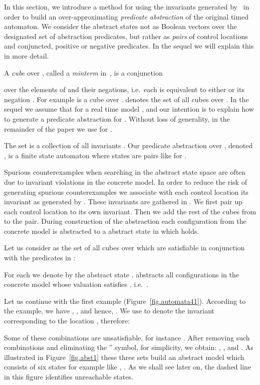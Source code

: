 \documentclass{eptcs}
\begin{document}
In this section, we introduce a method for using the invariants generated by
 \cipm\ in order to build an over-approximating {\em predicate abstraction} of the 
original timed automaton. 
We consider the abstract states not as Boolean vectors over the designated
set of abstraction predicates, but rather as {\em pairs} of control locations and
conjuncted, positive or negative predicates.  
In the sequel we will explain this in more detail.

A {\em cube}  over ,
called a {\em minterm} in~\cite{Lahiri06},
is a conjunction 
 
over the elements of  and their negations, 
i.e.\, each  is equivalent to either  or
its negation .
For example  is a cube over
.   denotes the set of all cubes over
. In the sequel we assume that  for a real time model
 , and our intention is to explain how to generate a predicate
 abstraction for . Without loss of generality, in the remainder of the paper 
we use  for .  
 
  
\begin{definition}[States of . ]
\label{def.abst}
The set  is a
collection of all invariants . Our predicate abstraction over
, denoted , is  a finite state automaton where states are
pairs like  for . 
\end{definition}

Spurious counterexamples when searching in the abstract state space are often due 
to invariant violations in the concrete model.
In order to reduce the risk of generating spurious counterexamples 
we associate with each control location  its invariant
as generated by \cipm . 
These invariants are gathered in .
We first pair up each control location to its own invariant. Then we
add the rest of the cubes from  to the pair. 
During construction of the abstraction each configuration  from the concrete
model is abstracted to a abstract state in which  holds.

Let us consider  as the set of all cubes over  which are
satisfiable in conjunction with the predicates in : 
 



\noindent
For each  we denote by  the abstract state 
.
 abstracts all configurations  in the concrete
model  whose valuation  satisfies , i.e.\ .

\begin{example}
Let us continue with the first example (Figure~\ref{fig.automata41}).
According to the example, we have ,
, 
 and hence, . 
We use  to denote the invariant corresponding to the location , therefore:



Some of these combinations are unsatisfiable, for instance .  
After removing such combinations and eliminating the
'' symbol, for simplicity, we obtain: , , and .
As illustrated in Figure~\ref{fig.abst1} these three sets build an abstract
model  which consists of six states for example like , 
. As we shall see later
on, the dashed line in this figure identifies unreachable states.
\end{example}
\end{document}
